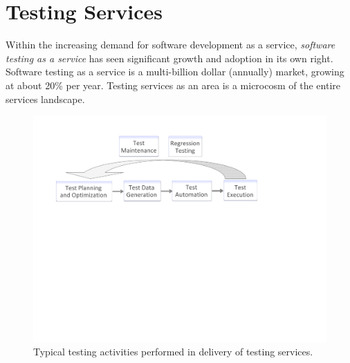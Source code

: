 
\section{Testing Services}
\label{sec:testing-debugging}

Within the increasing demand for software development as a service,
\textit{software testing as a service} has seen significant growth and adoption
in its own right.  Software testing as a service is a multi-billion dollar (annually) 
market, growing at about 20\% per year. Testing services as an area is a microcosm
of the entire services landscape.



\begin{figure}[t]
\centering
\includegraphics[width=\columnwidth, clip, trim = 22mm 133mm 65mm
  17mm]{figs/testing-activities.pdf}
\vspace*{-15pt}
\caption{Typical testing activities performed in delivery of testing services.}
\vspace*{-10pt}
\label{fig:testing-activities}
\end{figure}

